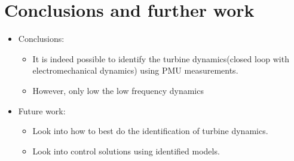 \section{Conclusions and further work}
\begin{frame}{\secname}
	\begin{itemize}
		\item Conclusions:
		\begin{itemize}
			\item It is indeed possible to identify the turbine dynamics(closed loop with electromechanical dynamics) using PMU measurements.
			\item However, only low the low frequency dynamics
		\end{itemize}
		\item Future work:
		\begin{itemize}
			\item Look into how to best do the identification of turbine dynamics.
			\item Look into control solutions using identified models.
		\end{itemize}
	\end{itemize}
\end{frame}

